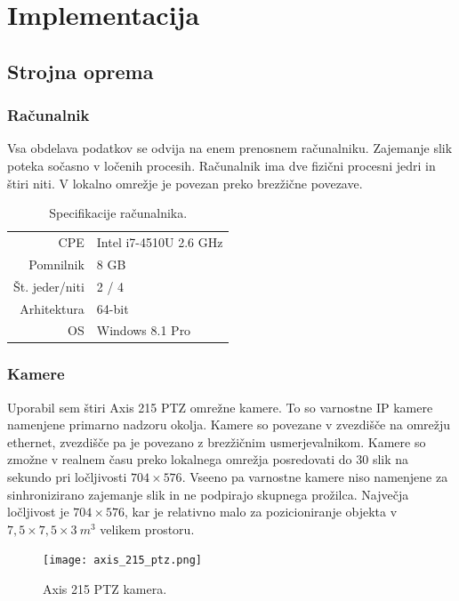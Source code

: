 \documentclass[a4paper, 12pt]{book}
\begin{document}
\chapter{Implementacija}

\section{Strojna oprema}

\subsection{Računalnik}
Vsa obdelava podatkov se odvija na enem prenosnem računalniku. Zajemanje slik poteka sočasno v ločenih procesih. Računalnik ima dve fizični procesni jedri in štiri niti. V lokalno omrežje je povezan preko brezžične povezave. 

\begin{table}[H]
\centering
\begin{tabular}{| r | l |}
\hline
CPE & Intel i7-4510U 2.6 GHz \\
Pomnilnik & 8 GB \\
Št. jeder/niti & 2 / 4 \\
Arhitektura & 64-bit \\
OS & Windows 8.1 Pro \\
\hline
\end{tabular}
\caption{Specifikacije računalnika.}
\end{table}

\subsection{Kamere}
Uporabil sem štiri Axis 215 PTZ omrežne kamere. To so varnostne IP kamere namenjene primarno nadzoru okolja. Kamere so povezane v zvezdišče na omrežju ethernet, zvezdišče pa je povezano z brezžičnim usmerjevalnikom.  Kamere so zmožne v realnem času preko lokalnega omrežja posredovati do 30 slik na sekundo pri ločljivosti $704 \times 576$. Vseeno pa varnostne kamere niso namenjene za sinhronizirano zajemanje slik in ne podpirajo skupnega prožilca. Največja ločljivost je $704 \times 576$, kar je relativno malo za pozicioniranje objekta v $7,5 \times 7,5 \times 3 \ m^3$ velikem prostoru.
\begin{figure}[H]
\centering
\texttt{[image: axis\_215\_ptz.png]}
\caption{Axis 215 PTZ kamera.}
\end{figure}
\end{document}
